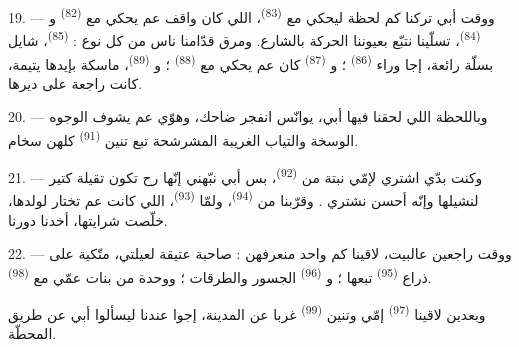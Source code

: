 19. --- ووقت أبي تركنا كم لحظة ليحكي مع 
\textsuperscript{(83)}، اللي كان واقف عم يحكي مع 
\textsuperscript{(82)} و \textsuperscript{(84)}،
تسلّينا نتبّع بعيوننا الحركة بالشارع. ومرق قدّامنا ناس من كل نوع :
 \textsuperscript{(85)}، شايل بسلّة 
رائعة، إجا وراء  \textsuperscript{(86)} ؛
و \textsuperscript{(87)} كان عم يحكي مع
 \textsuperscript{(88)} ؛ و
\textsuperscript{(89)}، ماسكة بإيدها يتيمة، كانت راجعة على ديرها.

\VUsaut{3.0mm}

20. --- وباللحظة اللي لحقنا فيها أبي، يوانّس انفجر ضاحك، وهوّي عم
يشوف الوجوه الوسخة والتياب الغريبة المشرشحة تبع تنين  \textsuperscript{(91)} كلهن سخام.

21. --- وكنت بدّي اشتري لإمّي نبتة من 
\textsuperscript{(92)}، بس أبي نبّهني إنّها رح تكون تقيلة كتير لنشيلها
وإنّه أحسن نشتري . وقرّبنا من 
\textsuperscript{(94)}، ولمّا  \textsuperscript{(93)}،
اللي كانت عم تختار لولدها، خلّصت شرايتها، أخدنا دورنا.

22. --- ووقت راجعين عالبيت، لاقينا كم واحد منعرفهن : صاحبة عتيقة
لعيلتي، متّكية على ذراع  \textsuperscript{(95)}
تبعها ؛ و \textsuperscript{(96)} الجسور والطرقات ؛ ووحدة من
بنات عمّي مع  \textsuperscript{(98)}.

وبعدين لاقينا  \textsuperscript{(97)} إمّي وتنين
 \textsuperscript{(99)} غربا عن المدينة، إجوا عندنا
ليسألوا أبي عن طريق المحطّة.

\VUsaut{6.0mm}
\VUfilet{22mm}
